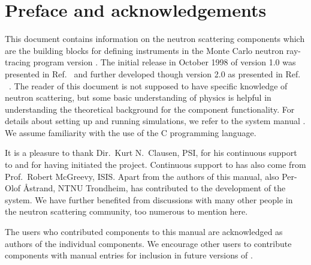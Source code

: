 
\chapter*{Preface and acknowledgements}
This document contains information on the neutron scattering components
which are the building blocks for defining instruments
in the Monte Carlo neutron
ray-tracing program \MCS version \version . The initial
release in October 1998 of version 1.0 was presented in Ref.~\cite{nn_10_20} and further developed though version 2.0 as
presented in Ref. ~\cite{mcs_ppf}.
The reader of this
document is not supposed to have specific knowledge of neutron scattering,
but some basic understanding of physics is helpful in
understanding the theoretical background for the component functionality.
For details about setting up and running simulations, we refer to
the \MCS system manual \cite{mcstasmanual}.
We assume familiarity with the use of
the C programming language.


It is a pleasure to thank Dir.~Kurt N.~Clausen, PSI, for his continuous
support to \MCS and for having initiated the project.
Continuous support to \MCS has also come from Prof.~Robert McGreevy, ISIS.
Apart from the authors of this manual, also Per-Olof Åstrand, NTNU Trondheim,
has contributed to the development of the \MCS system.
We have further benefited
from discussions with many other people in the neutron scattering
community, too numerous to mention here.

The users who contributed components to this manual are acknowledged
as authors of the individual components. We encourage other
users to contribute components with manual entries for inclusion in
future versions of \MCS.

